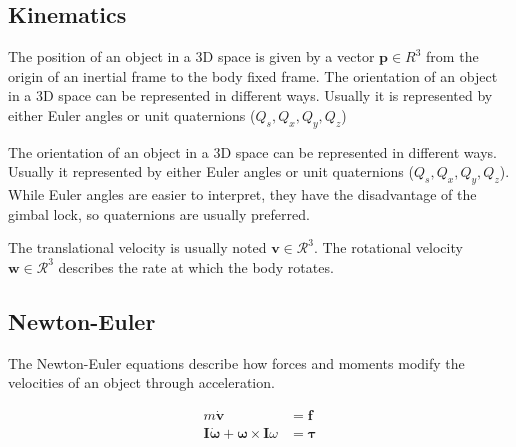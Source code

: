 \subsection{Kinematics}
The position of an object in a 3D space is given by a vector $\mathbf{p} \in R^3$ from the origin of an inertial frame to the body fixed frame. The orientation of an object in a 3D space can be represented in different ways. Usually it is represented by either Euler angles or unit quaternions ($Q_s, Q_x, Q_y, Q_z$)

The orientation of an object in a 3D space can be represented in different ways. Usually it represented by either Euler angles or unit quaternions ($Q_s, Q_x, Q_y, Q_z$). While Euler angles are easier to interpret, they have the disadvantage of the gimbal lock, so quaternions are usually preferred.

The translational velocity is usually noted $\mathbf{v} \in \mathcal{R}^3$. The rotational velocity $\mathbf{w} \in \mathcal{R}^3$ describes the rate at which the body rotates.

\subsection{Newton-Euler}
The Newton-Euler equations describe how forces and moments modify the velocities of an object through acceleration.

\begin{align}
m\dot{\mathbf{v}} &= \mathbf{f} \label{eq:newton1}\\
\mathbf{I}\dot{\mathbf{\omega}} + \mathbf{\omega} \times \mathbf{I}\omega &= \mathbf{\tau}
\end{align}

